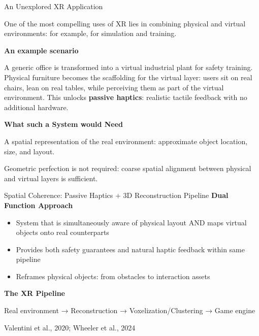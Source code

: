 \documentclass[aspectratio=169, 12pt]{beamer}
\newcommand{\citefooter}[1]{\hfill{\tiny #1}}
\begin{document}
\begin{frame}{An Unexplored XR Application}
	
	One of the most compelling uses of XR lies in combining physical and virtual environments: for example, for simulation and training.
	
	\vspace{0.3cm}
	
	\textbf{\textcolor{gbAqua}{An example scenario}}
	
	A generic office is transformed into a virtual industrial plant for safety training. 
	Physical furniture becomes the scaffolding for the virtual layer: users sit on real chairs, lean on real tables, while perceiving them as part of the virtual environment. 
	This unlocks \textbf{passive haptics}: realistic tactile feedback with no additional hardware.
	
	\vspace{0.3cm}
	
	\textbf{\textcolor{gbAqua}{What such a System would Need}}
	
	A spatial representation of the real environment: approximate object location, size, and layout.
	
	\vspace{0.2cm}
	
	\alert{Geometric perfection is not required}: coarse spatial alignment between physical and virtual layers is sufficient.
\end{frame}

\begin{frame}{Spatial Coherence: Passive Haptics + 3D Reconstruction Pipeline}
	\textbf{\textcolor{gbAqua}{Dual Function Approach}}
	
	\begin{itemize}
		\item System that is simultaneously aware of physical layout AND maps virtual objects onto real counterparts
		\item Provides both safety guarantees and natural haptic feedback within same pipeline
		\item Reframes physical objects: from obstacles to interaction assets
	\end{itemize}
	
	\vspace{0.3cm}
	
	\textbf{\textcolor{gbAqua}{The XR Pipeline}}
	
	Real environment → Reconstruction → Voxelization/Clustering → Game engine
		
	\citefooter{Valentini et al., 2020; Wheeler et al., 2024}
\end{frame}
\end{document}
